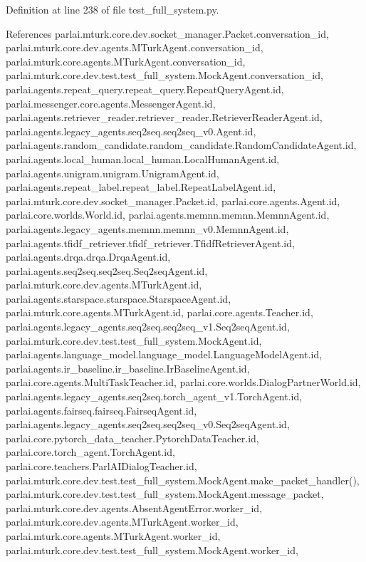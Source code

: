 Definition at line 238 of file test\+\_\+full\+\_\+system.\+py.



References parlai.\+mturk.\+core.\+dev.\+socket\+\_\+manager.\+Packet.\+conversation\+\_\+id, parlai.\+mturk.\+core.\+dev.\+agents.\+M\+Turk\+Agent.\+conversation\+\_\+id, parlai.\+mturk.\+core.\+agents.\+M\+Turk\+Agent.\+conversation\+\_\+id, parlai.\+mturk.\+core.\+dev.\+test.\+test\+\_\+full\+\_\+system.\+Mock\+Agent.\+conversation\+\_\+id, parlai.\+agents.\+repeat\+\_\+query.\+repeat\+\_\+query.\+Repeat\+Query\+Agent.\+id, parlai.\+messenger.\+core.\+agents.\+Messenger\+Agent.\+id, parlai.\+agents.\+retriever\+\_\+reader.\+retriever\+\_\+reader.\+Retriever\+Reader\+Agent.\+id, parlai.\+agents.\+legacy\+\_\+agents.\+seq2seq.\+seq2seq\+\_\+v0.\+Agent.\+id, parlai.\+agents.\+random\+\_\+candidate.\+random\+\_\+candidate.\+Random\+Candidate\+Agent.\+id, parlai.\+agents.\+local\+\_\+human.\+local\+\_\+human.\+Local\+Human\+Agent.\+id, parlai.\+agents.\+unigram.\+unigram.\+Unigram\+Agent.\+id, parlai.\+agents.\+repeat\+\_\+label.\+repeat\+\_\+label.\+Repeat\+Label\+Agent.\+id, parlai.\+mturk.\+core.\+dev.\+socket\+\_\+manager.\+Packet.\+id, parlai.\+core.\+agents.\+Agent.\+id, parlai.\+core.\+worlds.\+World.\+id, parlai.\+agents.\+memnn.\+memnn.\+Memnn\+Agent.\+id, parlai.\+agents.\+legacy\+\_\+agents.\+memnn.\+memnn\+\_\+v0.\+Memnn\+Agent.\+id, parlai.\+agents.\+tfidf\+\_\+retriever.\+tfidf\+\_\+retriever.\+Tfidf\+Retriever\+Agent.\+id, parlai.\+agents.\+drqa.\+drqa.\+Drqa\+Agent.\+id, parlai.\+agents.\+seq2seq.\+seq2seq.\+Seq2seq\+Agent.\+id, parlai.\+mturk.\+core.\+dev.\+agents.\+M\+Turk\+Agent.\+id, parlai.\+agents.\+starspace.\+starspace.\+Starspace\+Agent.\+id, parlai.\+mturk.\+core.\+agents.\+M\+Turk\+Agent.\+id, parlai.\+core.\+agents.\+Teacher.\+id, parlai.\+agents.\+legacy\+\_\+agents.\+seq2seq.\+seq2seq\+\_\+v1.\+Seq2seq\+Agent.\+id, parlai.\+mturk.\+core.\+dev.\+test.\+test\+\_\+full\+\_\+system.\+Mock\+Agent.\+id, parlai.\+agents.\+language\+\_\+model.\+language\+\_\+model.\+Language\+Model\+Agent.\+id, parlai.\+agents.\+ir\+\_\+baseline.\+ir\+\_\+baseline.\+Ir\+Baseline\+Agent.\+id, parlai.\+core.\+agents.\+Multi\+Task\+Teacher.\+id, parlai.\+core.\+worlds.\+Dialog\+Partner\+World.\+id, parlai.\+agents.\+legacy\+\_\+agents.\+seq2seq.\+torch\+\_\+agent\+\_\+v1.\+Torch\+Agent.\+id, parlai.\+agents.\+fairseq.\+fairseq.\+Fairseq\+Agent.\+id, parlai.\+agents.\+legacy\+\_\+agents.\+seq2seq.\+seq2seq\+\_\+v0.\+Seq2seq\+Agent.\+id, parlai.\+core.\+pytorch\+\_\+data\+\_\+teacher.\+Pytorch\+Data\+Teacher.\+id, parlai.\+core.\+torch\+\_\+agent.\+Torch\+Agent.\+id, parlai.\+core.\+teachers.\+Parl\+A\+I\+Dialog\+Teacher.\+id, parlai.\+mturk.\+core.\+dev.\+test.\+test\+\_\+full\+\_\+system.\+Mock\+Agent.\+make\+\_\+packet\+\_\+handler(), parlai.\+mturk.\+core.\+dev.\+test.\+test\+\_\+full\+\_\+system.\+Mock\+Agent.\+message\+\_\+packet, parlai.\+mturk.\+core.\+dev.\+agents.\+Absent\+Agent\+Error.\+worker\+\_\+id, parlai.\+mturk.\+core.\+dev.\+agents.\+M\+Turk\+Agent.\+worker\+\_\+id, parlai.\+mturk.\+core.\+agents.\+M\+Turk\+Agent.\+worker\+\_\+id, parlai.\+mturk.\+core.\+dev.\+test.\+test\+\_\+full\+\_\+system.\+Mock\+Agent.\+worker\+\_\+id, 